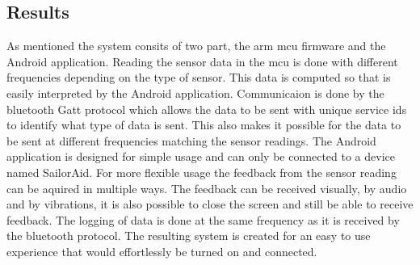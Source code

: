 \subsection{Results}
As mentioned the system consits of two part, the \gls{arm} \gls{mcu} firmware and the Android application. Reading the sensor data in the \gls{mcu} is done with different frequencies depending on the type of sensor. This data is computed so that is easily interpreted by the Android application. Communicaion is done by the bluetooth Gatt protocol which allows the data to be sent with unique service ids to identify what type of data is sent. This also makes it possible for the data to be sent at different frequencies matching the sensor readings. The Android application is designed for simple usage and can only be connected to a device named SailorAid. For more flexible usage the feedback from the sensor reading can be aquired in multiple ways. The feedback can be received visually, by audio and by vibrations, it is also possible to close the screen and still be able to receive feedback. The logging of data is done at the same frequency as it is received by the bluetooth protocol. The resulting system is created for an easy to use experience that would effortlessly be turned on and connected.
